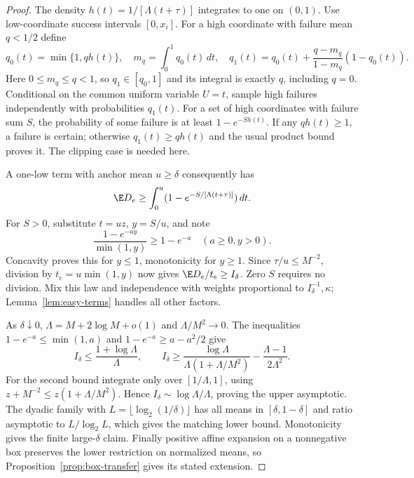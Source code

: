 \begin{proof}
The density $h(t)=1/[\Lambda(t+\tau)]$ integrates to one on $(0,1)$.
Use low-coordinate success intervals $[0,x_i]$. For a high coordinate
with failure mean $q<1/2$ define
\[
 q_0(t)=\min\{1,qh(t)\},\quad m_q=\int_0^1q_0(t)\,dt,\quad
 q_1(t)=q_0(t)+\frac{q-m_q}{1-m_q}(1-q_0(t)).
\]
Here $0\le m_q\le q<1$, so $q_1\in[q_0,1]$ and its integral is exactly
$q$, including $q=0$. Conditional on the common uniform variable $U=t$,
sample high failures independently with probabilities $q_1(t)$.
For a set of high coordinates with failure sum $S$, the probability of
some failure is at least $1-e^{-Sh(t)}$. If any $qh(t)\ge1$, a failure
is certain; otherwise $q_1(t)\ge qh(t)$ and the usual product bound proves
it. The clipping case is needed here.

A one-low term with anchor mean $u\ge\delta$ consequently has
\[
 \E D_e\ge\int_0^u(1-e^{-S/[\Lambda(t+\tau)]})\,dt.
\]
For $S>0$, substitute $t=uz$, $y=S/u$, and note
\[
 \frac{1-e^{-ay}}{\min(1,y)}\ge1-e^{-a}\quad(a\ge0,y>0).
\]
Concavity proves this for $y\le1$, monotonicity for $y\ge1$.
Since $\tau/u\le M^{-2}$, division by $t_e=u\min(1,y)$ now gives
$\E D_e/t_e\ge I_\delta$. Zero $S$ requires no division. Mix this law
and independence with weights proportional to $I_\delta^{-1},\kappa$;
Lemma~\ref{lem:easy-terms} handles all other factors.

As $\delta\downarrow0$, $\Lambda=M+2\log M+o(1)$ and
$\Lambda/M^2\to0$. The inequalities $1-e^{-a}\le\min(1,a)$ and
$1-e^{-a}\ge a-a^2/2$ give
\[
 I_\delta\le\frac{1+\log\Lambda}{\Lambda},\qquad
 I_\delta\ge\frac{\log\Lambda}{\Lambda(1+\Lambda/M^2)}
                   -\frac{\Lambda-1}{2\Lambda^2}.
\]
For the second bound integrate only over $[1/\Lambda,1]$, using
$z+M^{-2}\le z(1+\Lambda/M^2)$. Hence
$I_\delta\sim\log\Lambda/\Lambda$, proving the upper asymptotic.
The dyadic family with $L=\lfloor\log_2(1/\delta)\rfloor$ has all means
in $[\delta,1-\delta]$ and ratio asymptotic to $L/\log_2 L$, which gives
the matching lower bound. Monotonicity gives the finite large-$\delta$
claim. Finally positive affine expansion on a nonnegative box preserves
the lower restriction on normalized means, so
Proposition~\ref{prop:box-transfer} gives its stated extension.
\end{proof}


